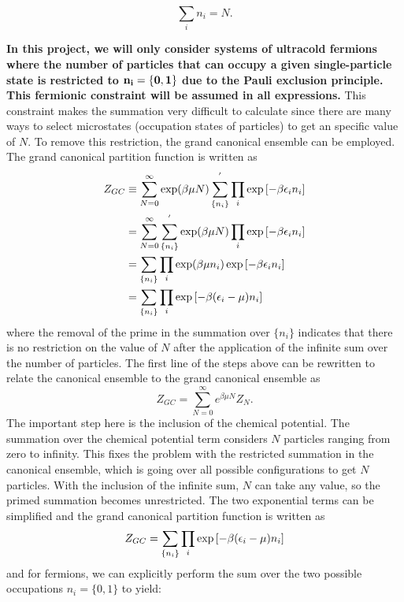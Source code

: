 \begin{equation}  
    \sum_i n_i=N.
\end{equation}

\textbf{In this project, we will only consider systems of ultracold fermions where the number of particles that can occupy a given single-particle state is restricted to $\bold{n_i=\{0,1\}}$ due to the Pauli exclusion principle. This fermionic constraint will be assumed in all expressions.} 
This constraint makes the summation very difficult to calculate since there are many ways to select microstates (occupation states of particles) to get an specific value of $N$. To remove this restriction, the grand canonical ensemble can be employed. The grand canonical partition function is written as 
\begin{align}
    Z_{GC}&\equiv\sum_{N=0}^{\infty} \exp(\beta\mu N) \sum_{\{n_i\}}^{'} \prod_i \exp\qty[-\beta\epsilon_i n_i]\nonumber\\
    &=\sum_{N=0}^{\infty}\sum_{\{n_i\}}^{'} \exp(\beta\mu N) \prod_i \exp\qty[-\beta\epsilon_i n_i]\nonumber\\
    &=\sum_{\{n_i\}} \prod_i \exp(\beta\mu n_i) \exp\qty[-\beta\epsilon_i n_i]\nonumber\\
    &=\sum_{\{n_i\}} \prod_i \exp\qty[-\beta\qty(\epsilon_i-\mu)n_i]
\end{align}
where the removal of the prime in the summation over $\{n_i\}$ indicates that there is no restriction on the value of $N$ after the application of the infinite sum over the number of particles. The first line of the steps above can be rewritten to relate the canonical ensemble to the grand canonical ensemble as
\begin{equation}
    Z_{GC}=\sum_{N=0}^{\infty} e^{\beta\mu N} Z_N.
\end{equation}
 The important step here is the inclusion of the chemical potential. The summation over the chemical potential term considers $N$ particles ranging from zero to infinity. This fixes the problem with the restricted summation in the canonical ensemble, which is going over all possible configurations to get $N$ particles. With the inclusion of the infinite sum, $N$ can take any value, so the primed summation becomes unrestricted. The two exponential terms can be simplified and the grand canonical partition function is written as 
\begin{equation}
    Z_{GC}=\sum_{\{n_i\}} \prod_i \exp\qty[-\beta\qty(\epsilon_i-\mu)n_i] \label{ZGC}
\end{equation}
and for fermions, we can explicitly perform the sum over the two possible occupations $n_i=\{0,1\}$ to yield:

